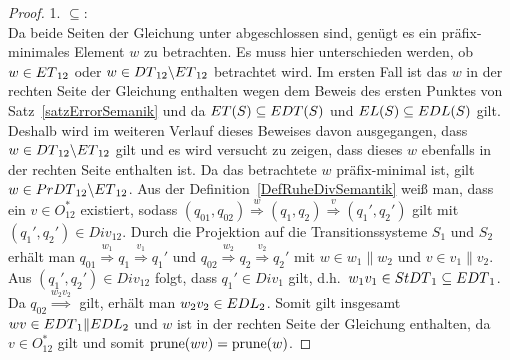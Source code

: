 \begin{proof}

  1. \glqq{}$\subseteq$\grqq{}:\\
  Da beide Seiten der Gleichung unter \cont{} abgeschlossen sind, genügt es ein
  präfix-mini\-ma\-les Element $w$ zu betrachten. Es muss hier unterschieden werden, ob
  $w\in ET{}_{12}$ oder $w\in DT{}_{12}\backslash ET{}_{12}$ betrachtet
  wird. Im ersten Fall ist das $w$ in der rechten Seite der Gleichung
  enthalten wegen dem Beweis des ersten Punktes von
  Satz~\ref{satzErrorSemanik} und da $ET{}(S)\subseteq EDT{}(S)$ und
  $EL{}(S)\subseteq EDL{}(S)$ gilt. Deshalb wird im weiteren Verlauf dieses
  Beweises
  davon ausgegangen, dass $w\in DT{}_{12}\backslash ET{}_{12}$ gilt und es
  wird versucht zu zeigen, dass dieses $w$ ebenfalls in der rechten Seite
  enthalten ist. Da das betrachtete $w$ präfix-minimal ist, gilt $w\in
  PrDT{}_{12}\backslash ET{}_{12}$. Aus der
  Definition~\ref{DefRuheDivSemantik} weiß man, dass ein $v\in O^*_{12}$
  existiert, sodass $(q_{01},q_{02}) \overset{w}{\Rightarrow} (q_1,q_2)
  \overset{v}{\Rightarrow} (q_1',q_2')$ gilt mit $(q_1',q_2')\in Div_{12}$.
  Durch die Projektion auf die Transitionssysteme $S_1$ und $S_2$ erhält man
  $q_{01} \overset{w_1}{\Rightarrow} q_1 \overset{v_1}{\Rightarrow} q_1'$ und
  $q_{02} \overset{w_2}{\Rightarrow} q_2 \overset{v_2}{\Rightarrow} q_2'$ mit
  $w\in w_1\|w_2$ und $v\in v_1\|v_2$. Aus $(q_1',q_2')\in Div_{12}$ folgt,
  dass \oBdA{} $q_1'\in Div_1$ gilt, d.h.\ $w_1v_1\in StDT{}_1\subseteq
  EDT{}_1$. Da $q_{02} \overset{w_2v_2}{\Longrightarrow}$ gilt, erhält man
  $w_2v_2\in EDL_2$. Somit gilt insgesamt $wv\in EDT{}_1\|EDL{}_2$ und $w$
  ist in der rechten Seite der Gleichung enthalten, da $v\in O_{12}^*$ gilt und
  somit $\mathrm{prune}{}(wv)=\mathrm{prune}{}(w)$.


\end{proof}
